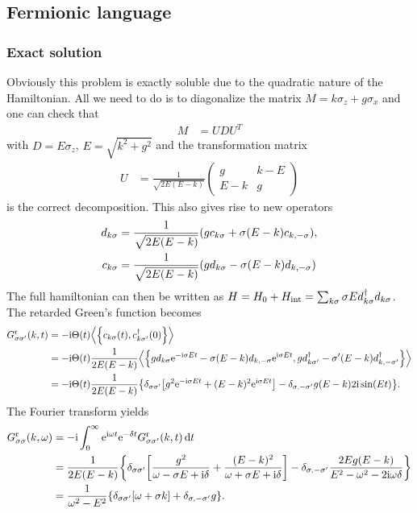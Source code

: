 \documentclass[english, parskip=full]{scrartcl}
\begin{document}
\subsection{Fermionic language}
\subsubsection{Exact solution}
Obviously this problem is exactly soluble due to the quadratic nature of the Hamiltonian.
All we need to do is to diagonalize the matrix $M = k\sigma_z + g\sigma_x$ and one can check that
\begin{align}
M &= UDU^T
\end{align}
with $D = E\sigma_z$, $E=\sqrt{k^2 + g^2}$ and the transformation matrix
\begin{align}
U &= \frac{1}{\sqrt{2E(E-k)}} \begin{pmatrix}
g & k-E \\ E-k & g
\end{pmatrix}
\end{align}
is the correct decomposition.
This also gives rise to new operators
\begin{align}
d_{k\sigma} &= \frac{1}{\sqrt{2E(E-k)}} \kla*{gc_{k\sigma} + \sigma (E-k) c_{k,-\sigma}},\\
c_{k\sigma} &= \frac{1}{\sqrt{2E(E-k)}} \kla*{gd_{k\sigma} - \sigma (E-k) d_{k,-\sigma}}
\end{align}
The full hamiltonian can then be written as $H=H_0+H_{\text{int}} = \sum_{k\sigma} \sigma E d_{k\sigma}^\dagger d_{k\sigma}$.
The retarded Green's function becomes
\begin{align}
G_{\sigma\sigma'}^\r(k,t) &= -\i\Theta(t) \bra*{\klc*{c_{k\sigma}(t) , c_{k\sigma'}^\dagger(0)}} \\
&= -\i\Theta(t) \frac{1}{2E(E-k)} \bra*{ \klc*{gd_{k\sigma} \powe{-\i \sigma Et} - \sigma (E-k)d_{k,-\sigma} \powe{\i \sigma Et} , gd_{k\sigma'}^\dagger -\sigma' (E-k) d_{k,-\sigma'}^\dagger} }\\
&= -\i\Theta(t) \frac{1}{2E(E-k)} \klc*{\delta_{\sigma\sigma'} \klb*{g^2 \powe{-\i\sigma Et} + (E-k)^2 \powe{\i\sigma Et}} - \delta_{\sigma,-\sigma'} g (E-k) 2\i\sin(Et)}.
\end{align}
The Fourier transform yields
\begin{align}
G_{\sigma\sigma}^\r(k,\omega) &= -\i \intx{0}{\infty}{\powe{\i\omega t} \powe{-\delta t} G_{\sigma\sigma'}^\r(k,t) }{t}\\
&= \frac{1}{2E(E-k)} \klc*{\delta_{\sigma\sigma'} \klb*{\frac{g^2}{\omega - \sigma E + \i\delta} + \frac{(E-k)^2}{\omega + \sigma E + \i\delta}} - \delta_{\sigma,-\sigma'} \frac{2E g(E-k)}{E^2 - \omega^2 - 2\i\omega \delta}}\\
&= \frac{1}{\omega^2 - E^2} \klc*{\delta_{\sigma\sigma'} \klb*{\omega + \sigma k} + \delta_{\sigma,-\sigma'} g}.
\end{align}
\end{document}
